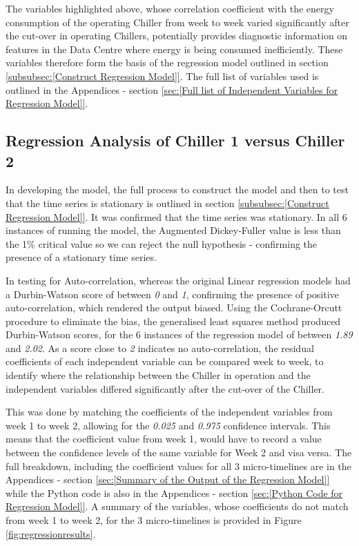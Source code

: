 \documentclass[12pt]{scrartcl}
\begin{document}
The variables highlighted above, whose correlation coefficient with the energy consumption of the operating Chiller from week to week varied significantly after the cut-over in operating Chillers, potentially provides diagnostic information on features in the Data Centre where energy is being consumed inefficiently. These variables therefore form the basis of the regression model outlined in section \ref{subsubsec:[Construct Regression Model]}. The full list of variables used is outlined in the Appendices - section \ref{sec:[Full list of Independent Variables for Regression Model]}. 

\subsection{Regression Analysis of Chiller 1 versus Chiller 2}
\label{subsec:[Regression Analysis of Chiller 1 versus Chiller 2]}

In developing the model, the full process to construct the model and then to test that the time series is stationary is outlined in section \ref{subsubsec:[Construct Regression Model]}. It was confirmed that the time series was stationary. In all 6 instances of running the model, the Augmented Dickey-Fuller value is less than the 1\% critical value so we can reject the null hypothesis - confirming the presence of a stationary time series. 

In testing for Auto-correlation, whereas the original Linear regression models had a Durbin-Watson score of between \textit{0} and \textit{1}, confirming the presence of positive auto-correlation, which rendered the output biased. Using the Cochrane-Orcutt procedure to eliminate the bias, the generalised least squares method produced Durbin-Watson scores, for the 6 instances of the regression model of between \textit{1.89} and \textit{2.02}. As a score close to \textit{2} indicates no auto-correlation, the residual coefficients of each independent variable can be compared week to week, to identify where the relationship between the Chiller in operation and the independent variables differed significantly after the cut-over of the Chiller. 

This was done by matching the coefficients of the independent variables from week 1 to week 2, allowing for the \textit{0.025} and \textit{0.975} confidence intervals. This means that the coefficient value from week 1, would have to record a value between the confidence levels of the same variable for Week 2 and visa versa. The full breakdown, including the coefficient values for all 3 micro-timelines are in the Appendices - section \ref{sec:[Summary of the Output of the Regression Model]} while the Python code is also in the Appendices - section \ref{sec:[Python Code for Regression Model]}. A summary of the variables, whose coefficients do not match from week 1 to week 2, for the 3 micro-timelines is provided in Figure \ref{fig:regressionresults}.
\end{document}
